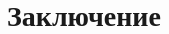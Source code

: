 
\usepackage{setspace}



\def\labauthors{{authors}}
\def\labgroup{{group}}
\def\labnumber{{number}}
\def\labtheme{{title}}
\renewcommand{\vec}{\mathbf}
\renewcommand{\Re}{\operatorname{Re}}
\renewcommand{\Im}{\operatorname{Im}}
\renewcommand{\phi}{\varphi}
\renewcommand{\kappa}{\varkappa}
\renewcommand{\hat}{\widehat}

\begin{spacing}{1}
\tableofcontents
\end{spacing}
\newpage
 
\section{}
\subsection{}



\newpage
\section{Заключение}

